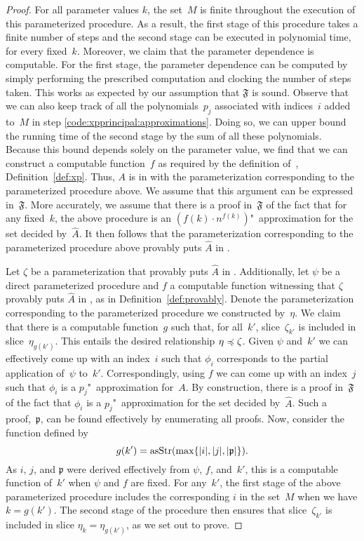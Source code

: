\begin{proof}
  For all parameter values $k$, the set~$M$ is finite throughout the execution of this parameterized procedure.
  As a result, the first stage of this procedure takes a finite number of steps and the second stage can be executed in polynomial time, for every fixed~$k$.
  Moreover, we claim that the parameter dependence is computable.
  For the first stage, the parameter dependence can be computed by simply performing the prescribed computation and clocking the number of steps taken.
  This works as expected by our assumption that $\mathfrak{F}$ is sound.
  Observe that we can also keep track of all the polynomials~$p_j$ associated with indices~$i$ added to~$M$ in step \ref{code:xpprincipal:approximations}.
  Doing so, we can upper bound the running time of the second stage by the sum of all these polynomials.
  Because this bound depends solely on the parameter value, we find that we can construct a computable function~$f$ as required by the definition of~, Definition~\ref{def:xp}.
  Thus, $A$ is in  with the parameterization corresponding to the parameterized procedure above.
  We assume that this argument can be expressed in~$\mathfrak{F}$.
  More accurately, we assume that there is a proof in~$\mathfrak{F}$ of the fact that for any fixed~$k$, the above procedure is an $(f(k) \cdot n^{f(k)})$"~approximation for the set decided by~$\hat{A}$.
  It then follows that the parameterization corresponding to the parameterized procedure above provably puts $\hat{A}$ in .

  Let $\zeta$ be a parameterization that provably puts $\hat{A}$ in .
  Additionally, let $\psi$ be a direct parameterized procedure and $f$ a computable function witnessing that $\zeta$ provably puts $\hat{A}$ in , as in Definition~\ref{def:provably}.
  Denote the parameterization corresponding to the parameterized procedure we constructed by~$\eta$.
  We claim that there is a computable function~$g$ such that, for all~$k'$, slice~$\zeta_{k'}$ is included in slice~$\eta_{g(k')}$.
  This entails the desired relationship $\eta \preccurlyeq \zeta$.
  Given $\psi$ and~$k'$ we can effectively come up with an index~$i$ such that $\phi_i$ corresponds to the partial application of~$\psi$ to~$k'$.
  Correspondingly, using $f$ we can come up with an index~$j$ such that $\phi_i$ is a $p_j$"~approximation for~$A$.
  By construction, there is a proof in~$\mathfrak{F}$ of the fact that $\phi_i$ is a $p_j$"~approximation for the set decided by~$\hat{A}$.
  Such a proof,~$\mathfrak{p}$, can be found effectively by enumerating all proofs.
  Now, consider the function defined by
  \begin{equation*}
    g(k') = \operatorname{asStr}(\max\{{\lvert i\rvert}, {\lvert j\rvert}, {\lvert\mathfrak{p}\rvert}\}).
  \end{equation*}
  As $i$, $j$, and $\mathfrak{p}$ were derived effectively from $\psi$, $f$, and~$k'$, this is a computable function of~$k'$ when $\psi$ and $f$ are fixed.
  For any~$k'$, the first stage of the above parameterized procedure includes the corresponding $i$ in the set~$M$ when we have $k = g(k')$.
  The second stage of the procedure then ensures that slice~$\zeta_{k'}$ is included in slice $\eta_k = \eta_{g(k')}$, as we set out to prove.
\end{proof}

